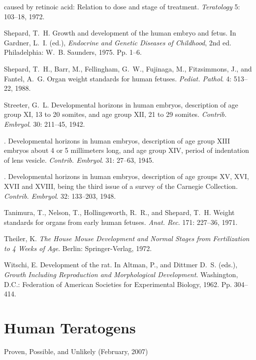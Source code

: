 \begin{numreferences}
caused by retinoic acid: Relation to dose and stage of treatment.
{\it Teratology} 5: 103--18, 1972.
\item Shepard, T.~H. Growth and development of the human embryo and fetus.
In Gardner, L.~I.
(ed.), {\it Endocrine and Genetic Diseases of Childhood}, 2nd ed.
Philadelphia: W.~B. Saunders, 1975. Pp. 1--6.
\item Shepard, T.~H., Barr, M., Fellingham, G.~W.,
Fujinaga, M., Fitzsimmons, J., and Fantel, A.~G.
Organ weight standards for human fetuses.
{\it Pediat. Pathol}. 4: 513--22, 1988.
\item Streeter, G.~L. Developmental horizons in human embryos,
description of age group XI, 13 to
20 somites, and age group XII, 21 to 29 somites.
{\it Contrib. Embryol}. 30: 211--45, 1942.
\item {}. Developmental horizons in human embryos,
description of age group XIII embryos
about 4 or 5 millimeters long, and age group XIV,
period of indentation of lens vesicle. 
{\it Contrib.  Embryol}. 31: 27--63, 1945.
\item {}. Developmental horizons in human embryos,
description of age groups XV, XVI, XVII
and XVIII, being the third issue of a survey of the Carnegie Collection.
{\it Contrib. Embryol}. 32: 133--203, 1948.
\item Tanimura, T., Nelson, T., Hollingsworth, R.~R., and Shepard, T.~H.
Weight standards for organs
from early human fetuses. {\it Anat. Rec}. 171: 227--36, 1971.
\item Theiler, K. {\it The House Mouse Development and Normal Stages
from Fertilization to 4 Weeks
of Age}. Berlin: Springer-Verlag, 1972.
\item Witschi, E. Development of the rat. In Altman, P.,
and Dittmer D.~S. (eds.), {\it Growth Including
Reproduction and Morphological Development}. Washington, D.C.:
Federation of American
Societies for Experimental Biology, 1962. Pp. 304--414.
\vspace*{3pc}
\
\end{numreferences}



\clearemptydoublepage
\chapter[Human Teratogens: Proven, Possible, and Unlikely]{Human Teratogens}

\vspace*{-1pc}
{\sffamily \Large       Proven, Possible, and Unlikely (February, 2007)}
\vspace*{2pc}



